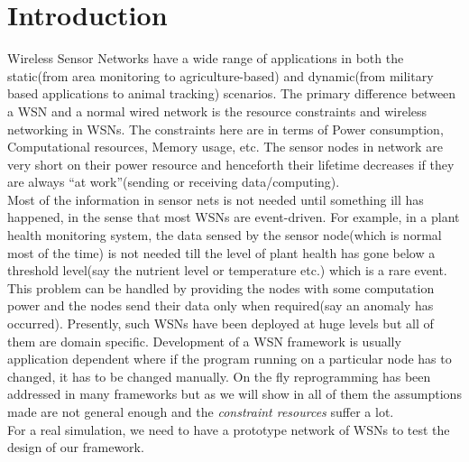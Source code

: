 \documentclass[twocolumn]{article}
\begin{document}



\begin{abstract}


\end{abstract}
\section{Introduction}
Wireless Sensor Networks have a wide range of applications in both the static(from area monitoring to agriculture-based) and dynamic(from military based applications to animal tracking) scenarios. The primary difference between a WSN and a normal wired network is the resource constraints and wireless networking in WSNs. The constraints here are in terms of Power consumption, Computational resources, Memory usage, etc. The sensor nodes in network are very short on their power resource and henceforth their lifetime decreases if they are always ``at work''(sending or receiving data/computing).\\
Most of the information in sensor nets is not needed until something ill has happened, in the sense that most WSNs are event-driven. For example, in a plant health monitoring system, the data sensed by the sensor node(which is normal most of the time) is not needed till the level of plant health has gone below a threshold level(say the nutrient level or temperature etc.) which is a rare event. This problem can be handled by providing the nodes with some computation power and the nodes send their data only when required(say an anomaly has occurred).
Presently, such WSNs have been deployed at huge levels but all of them are domain specific. Development of a WSN framework is usually application dependent where if the program running on a particular node has to changed, it has to be changed manually. On the fly reprogramming has been addressed in many frameworks but as we will show in all of them the assumptions made are not general enough and the \emph{constraint resources} suffer a lot.\\

For a real simulation, we need to have a prototype network of WSNs to test the design of our framework.
\end{document}
